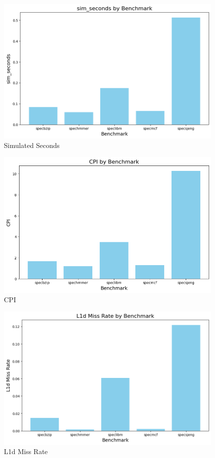 \documentclass{article}
\begin{document}
\begin{figure}[H]
    \centering
    \includegraphics[width=16cm]{bench_metrics/sim_secs.png}
    \caption{Simulated Seconds}
    \label{fig:enter-label}
\end{figure}

\begin{figure}[H]
    \centering
    \includegraphics[width=16cm]{bench_metrics/cpi.png}
    \caption{CPI}
    \label{fig:enter-label}
\end{figure}

\begin{figure}[H]
    \centering
    \includegraphics[width=16cm]{bench_metrics/l1d.png}
    \caption{L1d Miss Rate}
    \label{fig:enter-label}
\end{figure}
\end{document}
